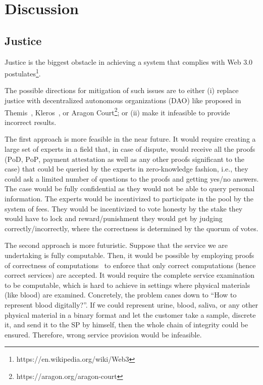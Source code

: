 \documentclass{ieeeaccess}
\begin{document}
\section{Discussion}
\label{sec:discussion}

\subsection{Justice}\label{justice}

Justice is the biggest obstacle in achieving a system that complies with Web 3.0 postulates\footnote{https://en.wikipedia.org/wiki/Web3}.

The possible directions for mitigation of such issues are to either (i) replace justice with decentralized autonomous organizations (DAO) like proposed in Themis~\cite{mengThemisDecentralizedEscrow2019}, Kleros~\cite{bergollaKlerosSociolegalCase2022}, or Aragon Court\footnote{https://aragon.org/aragon-court}; or (ii) make it infeasible to provide incorrect results.

The first approach is more feasible in the near future. It would require creating a large set of experts in a field that, in case of dispute, would receive all the proofs ($\mathrm{PoD}$, $\mathrm{PoP}$, payment $\mathrm{attestation}$ as well as any other proofs significant to the case) that could be queried by the experts in zero-knowledge fashion, i.e., they could ask a limited number of questions to the proofs and getting yes/no answers. The case would be fully confidential as they would not be able to query personal information. The experts would be incentivized to participate in the pool by the system of fees. They would be incentivized to vote honesty by the stake they would have to lock and reward/punishment they would get by judging correctly/incorrectly, where the correctness is determined by the quorum of votes.

The second approach is more futuristic. Suppose that the service we are undertaking is fully computable. Then, it would be possible by employing proofs of correctness of computations~\cite{ben-sassonSNARKsVerifyingProgram2013} to enforce that only correct computations (hence correct services) are accepted. It would require the complete service examination to be computable, which is hard to achieve in settings where physical materials (like blood) are examined. Concretely, the problem canes down to ``How to represent blood digitally?''. If we could represent urine, blood, saliva, or any other physical material in a binary format and let the customer take a sample, discrete it, and send it to the SP by himself, then the whole chain of integrity could be ensured. Therefore, wrong service provision would be infeasible.
\end{document}
